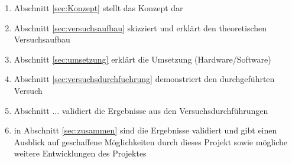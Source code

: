 \begin{enumerate}

\item Abschnitt \ref{sec:Konzept} stellt das Konzept dar

\item Abschnitt \ref{sec:versuchsaufbau} skizziert und erklärt den theoretischen Versuchsaufbau

\item Abschnitt \ref{sec:umsetzung} erklärt die Umsetzung (Hardware/Software)

\item Abschnitt \ref{sec:versuchsdurchfuehrung} demonstriert den durchgeführten Versuch

\item Abschnitt ... validiert die Ergebnisse aus den Versuchsdurchführungen %

\item in Abschnitt \ref{sec:zusammen} sind die Ergebnisse validiert und gibt einen Ausblick auf geschaffene Möglichkeiten durch dieses Projekt sowie mögliche weitere Entwicklungen des Projektes

\end{enumerate}

 





